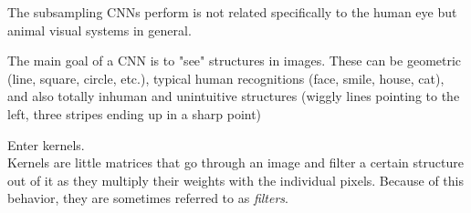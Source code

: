 The subsampling CNNs perform is not related specifically to the human eye but animal visual systems in general.  \cite{MasakazuMatsugu2003}  

The main goal of a CNN is to "see" structures in images.  
These can be geometric (line, square, circle, etc.),  
typical human recognitions (face, smile, house, cat),  
and also totally inhuman and unintuitive structures (wiggly lines pointing to the left, three stripes ending up in a sharp point)

Enter kernels.  \\
Kernels are little matrices that go through an image and filter a certain structure out of it as they multiply their weights with the individual pixels. Because of this behavior, they are sometimes referred to as \emph{filters}. 

